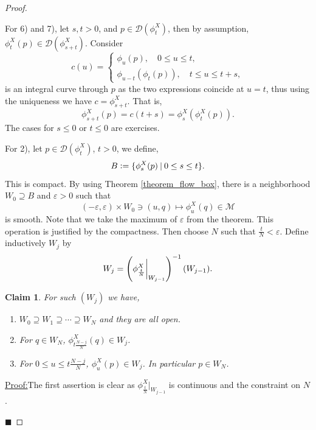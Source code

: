 \documentclass[8pt]{article}
\newtheorem{claim}{Claim}
\newenvironment{claimproof}[1]{\par\noindent\underline{Proof:}\space#1}{\hfill $\blacksquare$}
\newcommand{\defeq}{\vcentcolon=}
\newcommand{\M}[0]{\mathcal{M}}
\newcommand{\sep}[0]{\:|\:}
\begin{document}
\begin{proof}$\:$
  \par For 6) and 7), let $s,t>0$, and $p\in\mathcal{D}(\phi_t^X)$, then by assumption, $\phi_t^X(p)\in\mathcal{D}(\phi_{s+t}^X)$. Consider 
  \begin{equation*}
    c(u) = \begin{cases}
      \phi_u(p),\quad 0\leq u\leq t,\\
      \phi_{u-t}(\phi_t(p)), \quad t\leq u \leq t+s,
    \end{cases}
  \end{equation*}
  is an integral curve through $p$ as the two expressions coincide at $u=t$, thus using the uniqueness we have $c = \phi^X_{s+t}$. That is,
  \begin{equation*}
    \phi_{s+t}^X(p) = c(t+s) = \phi^X_s(\phi_t^X(p)).
  \end{equation*}
  The cases for $s\leq 0$ or $t\leq 0$ are exercises.
  \par For 2), let $p\in\mathcal{D}(\phi_t^X)$, $t>0$, we define,
  \begin{equation*}
    B\defeq\{\phi_s^X(p) \sep 0\leq s \leq t\}.
  \end{equation*}
  This is compact. By using Theorem \ref{theorem_flow_box}, there is a neighborhood $W_0\supseteq B$ and $\varepsilon>0$ such that 
  \begin{equation*}
    (-\varepsilon,\varepsilon)\times W_0\ni(u,q)\mapsto \phi_u^X(q) \in\M
  \end{equation*}
  is smooth. Note that we take the maximum of $\varepsilon$ from the theorem. This operation is justified by the compactness. Then choose $N$ such that ${\frac t N}<\varepsilon$. Define inductively $W_j$ by 
  \begin{equation*}
    W_j = \left(\phi_{{\frac t N}}^X\bigg{|}_{W_{j-1}}\right)^{-1}(W_{j-1}).
  \end{equation*}
  \begin{claim}For such $(W_j)$ we have,
  \begin{enumerate}[1).]
    \item $W_0\supseteq W_1\supseteq\cdots \supseteq W_N$ and they are all open.
    \item For $q\in W_N$, $\phi_{t{\frac {N-j} {N}}}^X(q)\in W_j$.
    \item For $0\leq u\leq t{\frac {N-j} N}$, $\phi_u^X(p)\in W_j$. In particular $p\in W_N$. 
  \end{enumerate}
  \end{claim}
  \begin{claimproof} The first assertion is clear as $\phi_{{\frac t N}}^X|_{W_{j-1}}$ is continuous and the constraint on $N$.

\end{claimproof}
\end{proof}
\end{document}
